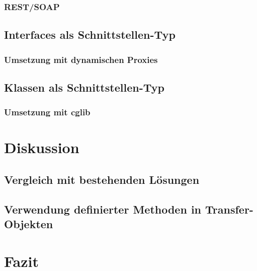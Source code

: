 \documentclass[11pt, 
ngerman,
doublespacing,
chapterinoneline, %
consistentlayout, %
]{scrartcl}
\begin{document}
\subsubsection{REST/SOAP}
\subsection{Interfaces als Schnittstellen-Typ}
\subsubsection{Umsetzung mit dynamischen Proxies}
\cite{proxy}
\subsection{Klassen als Schnittstellen-Typ}
\subsubsection{Umsetzung mit cglib}
\cite{cglib}
\section{Diskussion}
\subsection{Vergleich mit bestehenden Lösungen}
\subsection{Verwendung definierter Methoden in Transfer-Objekten}
\section{Fazit}

{}

\nocite{*}
\end{document}
